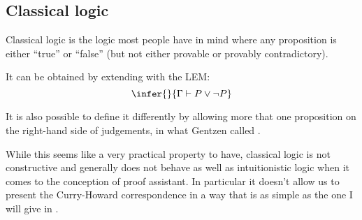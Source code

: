 \subsection{Classical logic}

Classical logic is the logic most people have in mind where any proposition is
either ``true'' or ``false'' (but not either provable or provably
contradictory).

It can be obtained by extending \NJ with the \acrfull{LEM}:
\[
  \infer
    { }
    {\Ga \vdash P \vee \neg P}
\]

It is also possible to define it differently by allowing more that one
proposition on the right-hand side of judgements, in what Gentzen called \NK.

While this seems like a very practical property to have, classical logic is
not constructive and generally does not behave as well as intuitionistic logic
when it comes to the conception of proof assistant. In particular it doesn't
allow us to present the Curry-Howard correspondence in a way that is as simple
as the one I will give in .






